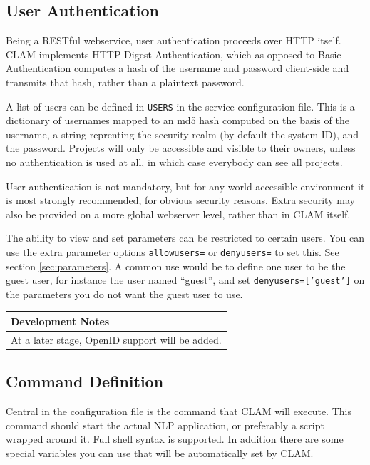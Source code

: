 \documentclass[a4paper,12pt]{report}
\newenvironment{devnotes}
{\newpage
\begin{center}
    \begin{tabular}[h!]{|p{0.8\textwidth}|}
    \hline
    {\bf Development Notes}\\\hline}
{   \\\hline
    \end{tabular}
\end{center}}
\begin{document}
\subsection{User Authentication}

Being a RESTful webservice, user authentication proceeds over HTTP itself. CLAM implements HTTP Digest Authentication, which as opposed to Basic Authentication computes a hash of the username and password client-side and transmits that hash, rather than a plaintext password. 

A list of users can be defined in \texttt{USERS} in the service configuration file. This is a dictionary of usernames mapped to an md5 hash computed on the basis of the username, a string reprenting the security realm (by default the system ID), and the password. Projects will only be accessible and visible to their owners, unless no authentication is used at all, in which case everybody can see all projects.


User authentication is not mandatory, but for any world-accessible environment it is most strongly recommended, for obvious security reasons. Extra security may also be provided on a more global webserver level, rather than in CLAM itself.

The ability to view and set parameters can be restricted to certain users. You can use the extra parameter options \texttt{allowusers=} or \texttt{denyusers=} to set this. See section \ref{sec:parameters}. A common use would be to define one user to be the guest user, for instance the user named ``guest'', and set \texttt{denyusers=['guest']} on the parameters you do not want the guest user to use.

\begin{devnotes}
At a later stage, OpenID support will be added.
\end{devnotes}


\subsection{Command Definition}
\label{sec:command}

Central in the configuration file is the command that CLAM will execute. This command should start the actual NLP application, or preferably a script wrapped around it. Full shell syntax is supported. In addition there are some special variables you can use that will be automatically set by CLAM. 
\end{document}
